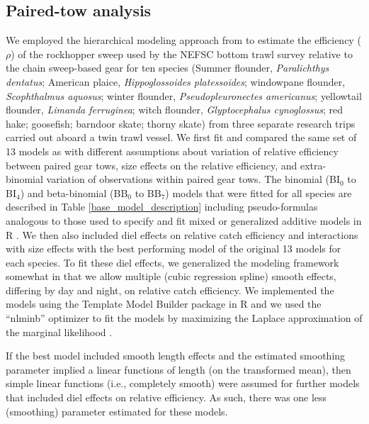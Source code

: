 \documentclass[
  12pt,
]{article}
\begin{document}
\hypertarget{paired-tow-analysis}{%
\subsection{Paired-tow analysis}\label{paired-tow-analysis}}

We employed the hierarchical modeling approach from \citet{miller13} to
estimate the efficiency (\(\rho\)) of the rockhopper sweep used by the
NEFSC bottom trawl survey relative to the chain sweep-based gear for ten
species (Summer flounder, \emph{Paralichthys dentatus}; American plaice,
\emph{Hippoglossoides platessoides}; windowpane flounder,
\emph{Scophthalmus aquosus}; winter flounder, \emph{Pseudopleuronectes
americanus}; yellowtail flounder, \emph{Limanda ferruginea}; witch
flounder, \emph{Glyptocephalus cynoglossus}; red hake; goosefish;
barndoor skate; thorny skate) from three separate research trips carried
out aboard a twin trawl vessel. We first fit and compared the same set
of 13 models as \citet{miller13} with different assumptions about
variation of relative efficiency between paired gear tows, size effects
on the relative efficiency, and extra-binomial variation of observations
within paired gear tows. The binomial (BI\(_0\) to BI\(_4\)) and
beta-binomial (BB\(_0\) to BB\(_7\)) models that were fitted for all
species are described in Table \ref{base_model_description} including
pseudo-formulas analogous to those used to specify and fit mixed or
generalized additive models in R \citep{R19,wood06}. We then also
included diel effects on relative catch efficiency and interactions with
size effects with the best performing model of the original 13 models
for each species. To fit these diel effects, we generalized the modeling
framework somewhat in that we allow multiple (cubic regression spline)
smooth effects, differing by day and night, on relative catch
efficiency. We implemented the models using the Template Model Builder
package \citep{kristensenetal16} in R and we used the ``nlminb''
optimizer to fit the models by maximizing the Laplace approximation of
the marginal likelihood \citep{R19}.

If the best model included smooth length effects and the estimated
smoothing parameter implied a linear functions of length (on the
transformed mean), then simple linear functions (i.e., completely
smooth) were assumed for further models that included diel effects on
relative efficiency. As such, there was one less (smoothing) parameter
estimated for these models.
\end{document}

